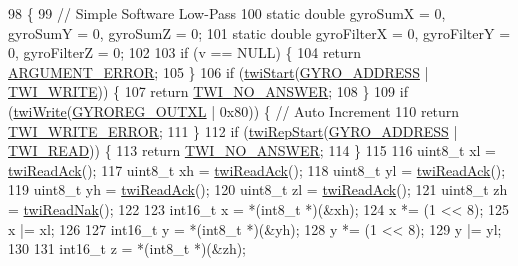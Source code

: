 \begin{DoxyCode}
98                             \{
99     \textcolor{comment}{// Simple Software Low-Pass}
100     \textcolor{keyword}{static} \textcolor{keywordtype}{double} gyroSumX = 0, gyroSumY = 0, gyroSumZ = 0;
101     \textcolor{keyword}{static} \textcolor{keywordtype}{double} gyroFilterX = 0, gyroFilterY = 0, gyroFilterZ = 0;
102 
103     \textcolor{keywordflow}{if} (v == NULL) \{
104         \textcolor{keywordflow}{return} \hyperlink{group__error_gga2c3e4bb40f36b262a5214e2da2bca9c5a49ccf277a69dd938c591928aa27c66cc}{ARGUMENT\_ERROR};
105     \}
106     \textcolor{keywordflow}{if} (\hyperlink{group__twi_ga4f86edc73f37ce976ea2225519ab31cd}{twiStart}(\hyperlink{group__gyro_ga8ed1f343e82440b4ef900e5fe42d74f0}{GYRO\_ADDRESS} | \hyperlink{group__twi_ga3b68e8e777b71520f9dbfac733774d5f}{TWI\_WRITE})) \{
107         \textcolor{keywordflow}{return} \hyperlink{group__error_gga2c3e4bb40f36b262a5214e2da2bca9c5a04d5943ba652af2205c88b247e0c659c}{TWI\_NO\_ANSWER};
108     \}
109     \textcolor{keywordflow}{if} (\hyperlink{group__twi_gaf42e50aaf4a9794d3a2c000e7b407887}{twiWrite}(\hyperlink{group__gyro_ga8840a0f1e53e6999ddf435a61c0dc279}{GYROREG\_OUTXL} | 0x80)) \{ \textcolor{comment}{// Auto Increment}
110         \textcolor{keywordflow}{return} \hyperlink{group__error_gga2c3e4bb40f36b262a5214e2da2bca9c5ac0e3b3463dcaf220e54794b4711708c9}{TWI\_WRITE\_ERROR};
111     \}
112     \textcolor{keywordflow}{if} (\hyperlink{group__twi_ga996e3cbbbb7239e2278bd286e61f0791}{twiRepStart}(\hyperlink{group__gyro_ga8ed1f343e82440b4ef900e5fe42d74f0}{GYRO\_ADDRESS} | \hyperlink{group__twi_gaaf9a8abccd811954f9cc316f2b2f87b3}{TWI\_READ})) \{
113         \textcolor{keywordflow}{return} \hyperlink{group__error_gga2c3e4bb40f36b262a5214e2da2bca9c5a04d5943ba652af2205c88b247e0c659c}{TWI\_NO\_ANSWER};
114     \}
115 
116     uint8\_t xl = \hyperlink{group__twi_ga0ab816bd0abcc24d6817f8395de7eafd}{twiReadAck}();
117     uint8\_t xh = \hyperlink{group__twi_ga0ab816bd0abcc24d6817f8395de7eafd}{twiReadAck}();
118     uint8\_t yl = \hyperlink{group__twi_ga0ab816bd0abcc24d6817f8395de7eafd}{twiReadAck}();
119     uint8\_t yh = \hyperlink{group__twi_ga0ab816bd0abcc24d6817f8395de7eafd}{twiReadAck}();
120     uint8\_t zl = \hyperlink{group__twi_ga0ab816bd0abcc24d6817f8395de7eafd}{twiReadAck}();
121     uint8\_t zh = \hyperlink{group__twi_ga5fad19b3784aeaa9ae995e64f9e965b8}{twiReadNak}();
122 
123     int16\_t x = *(int8\_t *)(&xh);
124     x *= (1 << 8);
125     x |= xl;
126 
127     int16\_t y = *(int8\_t *)(&yh);
128     y *= (1 << 8);
129     y |= yl;
130 
131     int16\_t z = *(int8\_t *)(&zh);

\end{DoxyCode}
